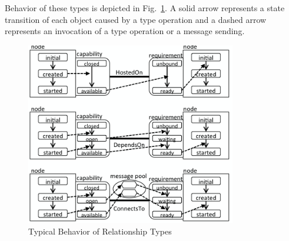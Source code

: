 \documentclass[12pt]{report}
\begin{document}
Behavior of these types is depicted in Fig.~\ref{fig:examplesem}.  A
solid arrow represents a state transition of each object caused by a
type operation and a dashed arrow represents an invocation of a type
operation or a message sending.

\begin{figure}
\centering
\includegraphics[height=8cm,natwidth=420,natheight=366]{./exsem.png}
\caption{Typical Behavior of Relationship Types}
\label{fig:examplesem}
\end{figure}
\end{document}
